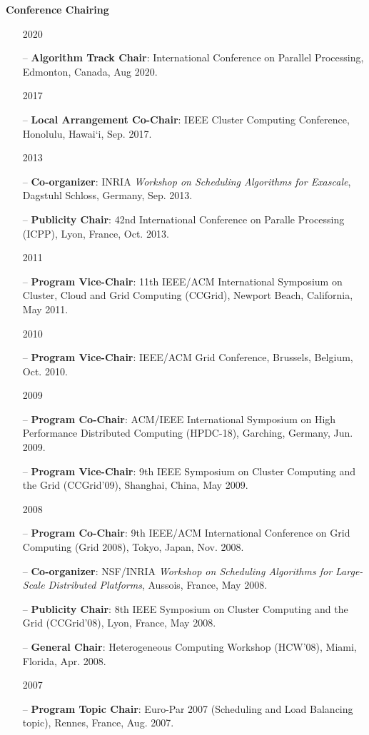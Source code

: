 \documentclass[times,11pt]{letter}
\begin{document}
\noindent
{\bf Conference Chairing}

\begin{itemize}
\item [2020]
\item[--] {\bf Algorithm Track Chair}: International Conference on Parallel Processing, Edmonton, Canada, Aug 2020.
\item [2017]
\item[--] {\bf Local Arrangement Co-Chair}: IEEE Cluster Computing Conference, Honolulu, Hawai`i, Sep. 2017. 
\item [2013]
\item[--] {\bf Co-organizer}: INRIA \emph{Workshop on Scheduling Algorithms for Exascale}, Dagstuhl Schloss, Germany, Sep. 2013.
\item[--] {\bf Publicity Chair}: 42nd International Conference on Paralle Processing (ICPP),  Lyon, France, Oct. 2013.
\item [2011]
\item[--] {\bf Program Vice-Chair}: 11th IEEE/ACM International Symposium on Cluster, Cloud and Grid Computing (CCGrid), Newport Beach, California, May 2011.
\item [2010]
\item[--] {\bf Program Vice-Chair}: IEEE/ACM Grid Conference, Brussels, Belgium, Oct. 2010.
\item [2009]
\item[--] {\bf Program Co-Chair}: ACM/IEEE International Symposium on High Performance Distributed Computing (HPDC-18), Garching, Germany, Jun. 2009.
\item[--] {\bf Program Vice-Chair}: 9th IEEE Symposium on Cluster Computing and the Grid (CCGrid'09), Shanghai, China, May 2009.
\item [2008]
\item[--] {\bf Program Co-Chair}: 9th IEEE/ACM International Conference on Grid Computing (Grid 2008), Tokyo, Japan, Nov. 2008.
\item[--] {\bf Co-organizer}: NSF/INRIA \emph{Workshop on Scheduling Algorithms for Large-Scale Distributed Platforms}, Aussois, France, May 2008.
\item[--] {\bf Publicity Chair}: 8th IEEE Symposium on Cluster Computing and the Grid (CCGrid'08), Lyon, France, May 2008.
\item[--] {\bf General Chair}: Heterogeneous Computing Workshop (HCW'08), Miami, Florida, Apr. 2008.
\item [2007]
\item[--] {\bf Program Topic Chair}: Euro-Par 2007 (Scheduling and Load Balancing topic), Rennes, France, Aug. 2007.

\end{itemize}
\end{document}
